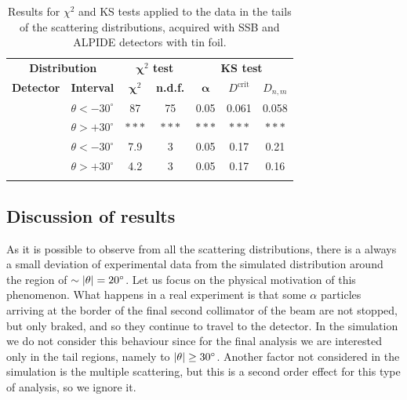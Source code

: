 \documentclass[../../main/main.tex]{subfiles}
\begin{document}
\begin{table}[h]
    \begin{tabular}{cl|cc|ccc}
        \toprule
        \multicolumn{2}{c|}{\textbf{Distribution}} &
        \multicolumn{2}{c|}{\textbf{$\boldsymbol{\chi}^2$ test}} &
        \multicolumn{3}{c}{\textbf{KS test}}\\
        \colrule
        \textbf{Detector} & \textbf{Interval} & $\boldsymbol{\chi}^2$ &
        \textbf{n.d.f.} & $\boldsymbol{\alpha}$ & $D^{\mathrm{crit}}$
        & $D_{n,m}$\\
        \colrule
        \multirow{2}{*}{ALPIDE} & $\theta < -30^{\circ} $ & 87 & 75 & 0.05 & 0.061  & 0.058 \\
                                & $\theta > +30^{\circ} $ & \( *** \) & \( *** \) & \( *** \)  & \( *** \)   & \( *** \)  \\
        \colrule
        \multirow{2}{*}{SSB }   & $\theta < -30^{\circ} $ & 7.9 & 3 &0.05 & 0.17 & 0.21 \\
                                & $\theta > +30^{\circ} $ & 4.2 & 3 &0.05 & 0.17 & 0.16 \\
        \botrule
    \end{tabular}
    \caption{Results for \( \chi^{2} \) and KS tests applied to the data in the tails of the scattering distributions, acquired with SSB and ALPIDE detectors with tin foil.}
    \label{tab:statsTIN}
\end{table}



\subsection{Discussion of results}
As it is possible to observe from all the scattering distributions, there is a always a small deviation of experimental data from the simulated distribution around the region of \( \sim \abs{\theta} = 20^{\circ} \). Let us focus on the physical motivation of this phenomenon. What happens in a real experiment is that some \( \alpha \) particles arriving at the border of the final second collimator of the beam are not stopped, but only braked, and so they continue to travel to the detector. In the simulation we do not consider this behaviour since for the final analysis we are interested only in the tail regions, namely to \( \abs{\theta} \geq 30^{\circ} \). Another factor not considered in the simulation is the multiple scattering, but this is a second order effect for this type of analysis, so we ignore it.
\end{document}
